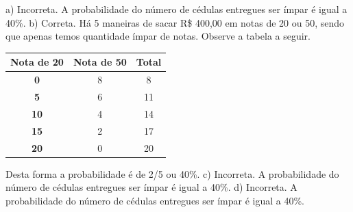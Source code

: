 \begin{escolha}
\begin{boxmedio}
\begin{boxmedio}
{\begin{boxpeq}
\begin{boxpeq}
{\begin{boxpeq}
\begin{boxmedio}
\begin{boxmedio}
\begin{boxpeq}
\begin{boxmedio}
\begin{boxpeq}
\begin{boxpeq}
\begin{boxpeq}
\begin{boxpeq}
\begin{boxmedio}
{\begin{boxmedio}
\begin{boxmedio}
\begin{boxpeq}
\begin{boxmedio}
\begin{boxpeq}
\begin{boxpeq}
\begin{boxpeq}
\begin{escolha}
{\begin{boxmedio}
\begin{boxpeq}
\begin{boxpeq}
\begin{boxpeq}
\begin{boxpeq}
\begin{boxpeq}
\begin{boxmedio}
\begin{boxpeq}
\begin{boxpeq}
\begin{boxpeq}
{\begin{boxpeq}
\begin{boxmedio}
\begin{boxpeq}
\begin{boxpeq}
\begin{boxpeq}
{\begin{boxpeq}
\begin{boxmedio}
{\begin{boxpeq}
\begin{boxpeq}
\begin{boxmedio}
\begin{boxmedio}
\begin{boxpeq}
\begin{boxpeq}
{\begin{boxpeq}
\begin{boxpeq}
\begin{boxpeq}
\begin{boxpeq}
\begin{boxpeq}
\begin{escolha}
\begin{escolha}
{\begin{boxmedio}
\begin{boxpeq}
\begin{q°}
\begin{boxmedio}
\begin{boxpeq}
\begin{boxpeq}
\begin{boxmedio}
\begin{boxmedio}
\begin{boxmedio}
\begin{boxmedio}
{\begin{enumerate}
\begin{boxpeq}
{\begin{boxpeq}
\begin{boxpeq}
\begin{boxmedio}
\begin{boxpeq}
\begin{boxpeq}
\begin{boxpeq}
{a) Incorreta. A probabilidade do número de cédulas entregues ser ímpar é igual a 40\%. 
b) Correta. Há 5 maneiras de sacar R\$ 400,00 em notas de 20 ou 50, sendo que apenas temos quantidade ímpar de notas. Observe a tabela a seguir.

\begin{table}[]
\begin{tabular}{|c|c|c|}
\hline
\textbf{Nota de 20} & \textbf{Nota de 50} & \textbf{Total} \\ \hline
\textbf{0} & 8 & 8 \\ \hline
\textbf{5} & 6 & 11 \\ \hline
\textbf{10} & 4 & 14 \\ \hline
\textbf{15} & 2 & 17 \\ \hline
\textbf{20} & 0 & 20 \\ \hline
\end{tabular}
\end{table}

Desta forma a probabilidade é de 2/5 ou 40\%.
c) Incorreta. A probabilidade do número de cédulas entregues ser ímpar é igual a 40\%. 
d) Incorreta. A probabilidade do número de cédulas entregues ser ímpar é igual a 40\%.}


\end{boxpeq}
\end{boxpeq}
\end{boxpeq}
\end{boxmedio}
\end{boxpeq}
\end{boxpeq}}
\end{boxpeq}
\end{enumerate}}
\end{boxmedio}
\end{boxmedio}
\end{boxmedio}
\end{boxmedio}
\end{boxpeq}
\end{boxpeq}
\end{boxmedio}
\end{q°}
\end{boxpeq}
\end{boxmedio}}
\end{escolha}
\end{escolha}
\end{boxpeq}
\end{boxpeq}
\end{boxpeq}
\end{boxpeq}
\end{boxpeq}}
\end{boxpeq}
\end{boxpeq}
\end{boxmedio}
\end{boxmedio}
\end{boxpeq}
\end{boxpeq}}
\end{boxmedio}
\end{boxpeq}}
\end{boxpeq}
\end{boxpeq}
\end{boxpeq}
\end{boxmedio}
\end{boxpeq}}
\end{boxpeq}
\end{boxpeq}
\end{boxpeq}
\end{boxmedio}
\end{boxpeq}
\end{boxpeq}
\end{boxpeq}
\end{boxpeq}
\end{boxpeq}
\end{boxmedio}}
\end{escolha}
\end{boxpeq}
\end{boxpeq}
\end{boxpeq}
\end{boxmedio}
\end{boxpeq}
\end{boxmedio}
\end{boxmedio}}
\end{boxmedio}
\end{boxpeq}
\end{boxpeq}
\end{boxpeq}
\end{boxpeq}
\end{boxmedio}
\end{boxpeq}
\end{boxmedio}
\end{boxmedio}
\end{boxpeq}}
\end{boxpeq}
\end{boxpeq}}
\end{boxmedio}
\end{boxmedio}
\end{escolha}
